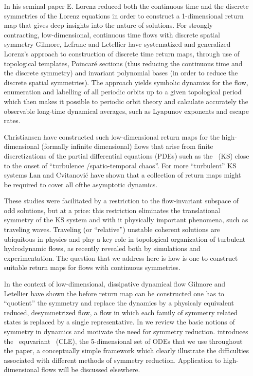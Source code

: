 %
In his seminal paper E. Lorenz reduced both
the continuous time and the discrete symmetries of the
Lorenz equations in order to construct a 1-dimensional 
return map that gives deep insights into the nature of solutions.
For strongly contracting, low-dimensional, continuous time
flows with discrete spatial symmetry
Gilmore, Lefranc and Letellier
have systematized and generalized 
Lorenz's approach to construction of discrete time return maps, through 
use of topological templates, Poincar\'e sections (thus
reducing the continuous time and the discrete symmetry)
and invariant polynomial bases (in order to reduce the
discrete spatial symmetries).
The approach yields symbolic dynamics for the flow,
enumeration and labelling of all periodic orbits up to a given 
topological period which then makes it possible to 
periodic orbit theory and calculate accurately
the observable long-time dynamical averages, such as Lyapunov exponents 
and escape rates.

Christiansen \etal{} have constructed such 
low-dimensional return maps for the
high-dimensional (formally
infinite dimensional)  flows that arise from finite discretizations
of the  partial differential equations (PDEs) such as the
\KSe\ (KS) close to the 
onset of ``turbulence /spatio-temporal chaos''.
For more ``turbulent'' KS systems Lan and Cvitanovi\'{c}
have shown that a collection of return maps might
be required to cover all ofthe asymptotic dynamics.

These studies were facilitated by a restriction to the flow-invariant 
subspace of odd solutions, but at a price: this restriction eliminates the translational 
symmetry of the KS system and with it physically important phenomena, such as
traveling waves. Traveling (or ``relative'') unstable
coherent solutions are ubiquitous in physics and 
play a key role in topological organization of turbulent hydrodynamic flows,
as recently revealed both by simulations 
and experimentation.
The question that we address here is how is one to construct suitable return maps
for flows with continuous symmetries.

In the context of low-dimensional, dissipative dynamical flow 
Gilmore and Letellier have shown the before return
map can be constructed one has to ``quotient'' the symmetry and
replace the dynamics by a physicaly equivalent 
reduced, desymmetrized flow, a flow in which each family of symmetry related states
is replaced by a single representative. 
In  we
review the basic notions of symmetry in dynamics 
and motivate the need for symmetry 
reduction.
 introduces the \ equvariant
 \cLe\ (CLE),
the 5-dimensional set of ODEs that we use throughout the paper,
a conceptually  simple framework which clearly
illustrate the difficulties associated with  different
methods of symmetry reduction.
Application to high-dimensional flows will
be discussed elsewhere.

